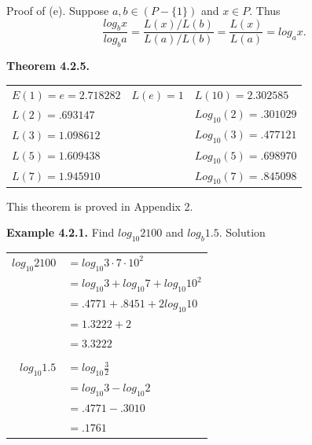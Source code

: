 Proof of (e). Suppose $a,b\in(P-\{1\})$ and $x\in P.$ Thus
\[
\dfrac{log_{b}x}{log_{b}a} = \dfrac{L(x)/L(b)}{L(a)/L(b)} = \dfrac{L(x)}{L(a)} = log_{a}x.
\]

\newpage
\textbf{Theorem 4.2.5.}\nl
\begin{tabular}{l l l}
$E(1) = e = 2.718282$&$L(e) = 1$&$L(10) = 2.302585$\\
$L(2) = .693147$&&$Log_{10}(2) = .301029$\\
$L(3) = 1.098612$&&$Log_{10}(3) = .477121$\\
$L(5) = 1.609438$&&$Log_{10}(5) = .698970$\\
$L(7) = 1.945910$&&$Log_{10}(7) = .845098$\\
\end{tabular}\nl

This theorem is proved in Appendix 2.\nl


\textbf{Example 4.2.1.} Find $log_{10}2100$ and $log_{b} 1.5.$ \nl
Solution\nl

\begin{tabular}{r l}
$log_{10}2100$&$=log_{10}3\cdot 7\cdot 10^{2}$\\
&$=log_{10}3 + log_{10}7 + log_{10}10^{2}$\\
&$= .4771 + .8451 + 2log_{10}10 $\\
&$=1.3222+2$\\
&$=3.3222$\\
&\\
$log_{10}1.5$&$=log_{10}\frac{3}{2}$\\
&$=log_{10}3 - log_{10}2$\\
&$= .4771 - .3010$\\
&$= .1761$\\
\end{tabular}\\

